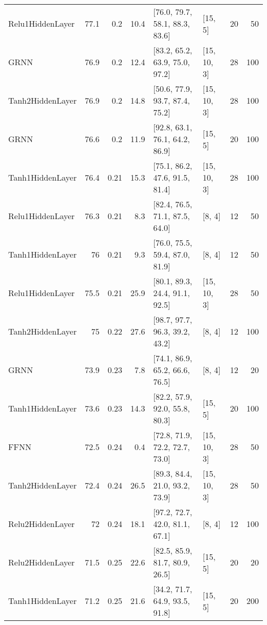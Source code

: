 \begin{table*}
\begin{tabular}{lrrrllrr}
 Relu1HiddenLayer   & 77.1 &  0.2  &     10.4 & [76.0, 79.7, 58.1, 88.3, 83.6]  & [15, 5]        &         20 &       50 \\
 GRNN               & 76.9 &  0.2  &     12.4 & [83.2, 65.2, 63.9, 75.0, 97.2]  & [15, 10, 3]    &         28 &      100 \\
 Tanh2HiddenLayer   & 76.9 &  0.2  &     14.8 & [50.6, 77.9, 93.7, 87.4, 75.2]  & [15, 10, 3]    &         28 &      100 \\
 GRNN               & 76.6 &  0.2  &     11.9 & [92.8, 63.1, 76.1, 64.2, 86.9]  & [15, 5]        &         20 &      100 \\
 Tanh1HiddenLayer   & 76.4 &  0.21 &     15.3 & [75.1, 86.2, 47.6, 91.5, 81.4]  & [15, 10, 3]    &         28 &      100 \\
 Relu1HiddenLayer   & 76.3 &  0.21 &      8.3 & [82.4, 76.5, 71.1, 87.5, 64.0]  & [8, 4]         &         12 &       50 \\
 Tanh1HiddenLayer   & 76   &  0.21 &      9.3 & [76.0, 75.5, 59.4, 87.0, 81.9]  & [8, 4]         &         12 &       50 \\
 Relu1HiddenLayer   & 75.5 &  0.21 &     25.9 & [80.1, 89.3, 24.4, 91.1, 92.5]  & [15, 10, 3]    &         28 &       50 \\
 Tanh2HiddenLayer   & 75   &  0.22 &     27.6 & [98.7, 97.7, 96.3, 39.2, 43.2]  & [8, 4]         &         12 &      100 \\
 GRNN               & 73.9 &  0.23 &      7.8 & [74.1, 86.9, 65.2, 66.6, 76.5]  & [8, 4]         &         12 &       20 \\
 Tanh1HiddenLayer   & 73.6 &  0.23 &     14.3 & [82.2, 57.9, 92.0, 55.8, 80.3]  & [15, 5]        &         20 &      100 \\
 FFNN               & 72.5 &  0.24 &      0.4 & [72.8, 71.9, 72.2, 72.7, 73.0]  & [15, 10, 3]    &         28 &       50 \\
 Tanh2HiddenLayer   & 72.4 &  0.24 &     26.5 & [89.3, 84.4, 21.0, 93.2, 73.9]  & [15, 10, 3]    &         28 &       50 \\
 Relu2HiddenLayer   & 72   &  0.24 &     18.1 & [97.2, 72.7, 42.0, 81.1, 67.1]  & [8, 4]         &         12 &      100 \\
 Relu2HiddenLayer   & 71.5 &  0.25 &     22.6 & [82.5, 85.9, 81.7, 80.9, 26.5]  & [15, 5]        &         20 &       20 \\
 Tanh1HiddenLayer   & 71.2 &  0.25 &     21.6 & [34.2, 71.7, 64.9, 93.5, 91.8]  & [15, 5]        &         20 &      200 \\

\end{tabular}
\end{table*}
